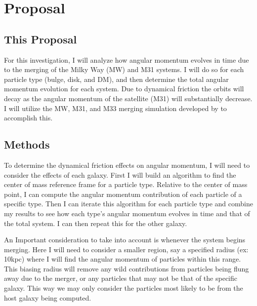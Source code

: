 \documentclass[linenumbers,trackchanges]{aastex7}
\begin{document}
\newpage



\section{Proposal}

\subsection{This Proposal} %

For this investigation, I will analyze how angular momentum evolves in time due to the merging of the Milky Way (MW) and M31 systems. I will do so for each particle type (bulge, disk, and DM), and then determine the total angular momentum evolution for each system. Due to dynamical friction the orbits will decay as the angular momentum of the satellite (M31) will substantially decrease. I will utilize the MW, M31, and M33 merging simulation developed by \cite{vandermarel2012} to accomplish this.


\subsection{Methods} %

To determine the dynamical friction effects on angular momentum, I will need to consider the effects of each galaxy. First I will build an algorithm to find the center of mass reference frame for a particle type. Relative to the center of mass point, I can compute the angular momentum contribution of each particle of a specific type. Then I can iterate this algorithm for each particle type and combine my results to see how each type's angular momentum evolves in time and that of the total system. I can then repeat this for the other galaxy. 

\vspace{10pt}

An Important consideration to take into account is whenever the system begins merging. Here I will need to consider a smaller region, say a specified radius (ex: 10kpc) where I will find the angular momentum of particles within this range. This biasing radius will remove any wild contributions from particles being flung away due to the merger, or any particles that may not be that of the specific galaxy. This way we may only consider the particles most likely to be from the host galaxy being computed. 
\end{document}
